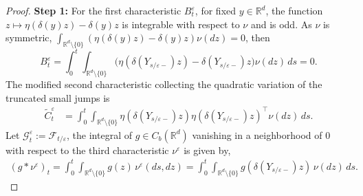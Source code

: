 \documentclass[11pt,reqno]{amsart}
\numberwithin{equation}{section}
\begin{document}
\begin{proof}
	\textbf{Step 1:} For the first characteristic $B_t^\varepsilon$,  for fixed $y\in\mathbb R^d$, the function
	$
	z\mapsto \eta(\delta(y)z)-\delta(y)z
	$
	is integrable with respect to $\nu$ and is odd. As $\nu$ is
	symmetric, $\int_{\mathbb R^d\setminus\{0\}}
	(\eta(\delta(y)z)-\delta(y)z)\nu(dz)=0 $, then
	\begin{equation}\label{bv-b}
	B_t^\varepsilon=
	\int_0^t\int_{\mathbb R^d\setminus\{0\}}
	\big(\eta(\delta(Y_{s/\varepsilon-})z)
	-\delta(Y_{s/\varepsilon-})z\big)
	\nu(dz)\,ds=0.
		\end{equation}
The modified second characteristic collecting the quadratic variation of the truncated small jumps is
	\begin{align}	\label{sec-char}
	\widetilde C^\varepsilon_t
	&=\int_0^t	\int_{\mathbb R^d\setminus\{0\}}	\eta(\delta(Y_{s/\varepsilon-})z)
	\eta(\delta(Y_{s/\varepsilon-})z)^\top\nu(dz)\,ds.
	\end{align}
Let $\mathcal G_t^\varepsilon:=\mathcal F_{t/\varepsilon}$,
 the integral of $g\in C_b(\mathbb R^d)$ vanishing in a neighborhood of $0$ with respect to the third characteristic $\nu^\varepsilon$ is given by,  
\begin{align}\label{thir-char}
	(g*\nu^\varepsilon)_t=\int_0^t\int_{\mathbb R^d\setminus\{0\}}
	g(z)\,\nu^\varepsilon(ds,dz)=
	\int_0^t\int_{\mathbb R^d\setminus\{0\}}
	g(\delta(Y_{s/\varepsilon-})z)\,\nu(dz)\,ds.
\end{align}
	
	
	

\end{proof}
\end{document}
